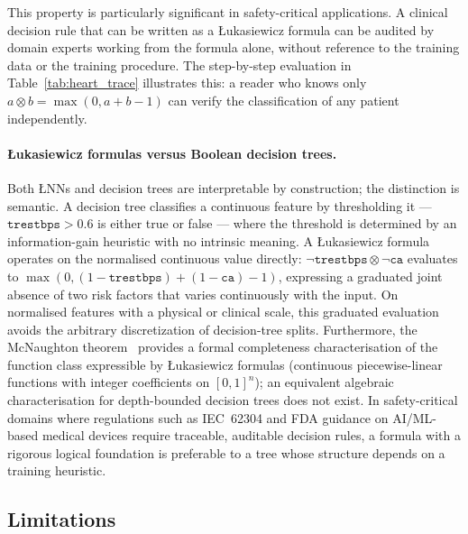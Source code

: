 \documentclass[10pt,a4paper,twoside]{article}
\newcommand{\tnorm}{\otimes}      %
\newcommand{\LNN}{\L{}NN}
\begin{document}
This property is particularly significant in safety-critical applications.
A clinical decision rule that can be written as a \L{}ukasiewicz formula can
be audited by domain experts working from the formula alone, without reference
to the training data or the training procedure.
The step-by-step evaluation in Table~\ref{tab:heart_trace} illustrates this:
a reader who knows only $a \tnorm b = \max(0, a+b-1)$ can verify the
classification of any patient independently.

\paragraph{\L{}ukasiewicz formulas versus Boolean decision trees.}
Both \LNN{}s and decision trees are interpretable by construction; the
distinction is semantic.
A decision tree classifies a continuous feature by thresholding it ---
$\mathtt{trestbps} > 0.6$ is either true or false --- where the threshold
is determined by an information-gain heuristic with no intrinsic meaning.
A \L{}ukasiewicz formula operates on the normalised continuous value
directly: $\neg\mathtt{trestbps} \tnorm \neg\mathtt{ca}$ evaluates to
$\max(0,(1-\mathtt{trestbps})+(1-\mathtt{ca})-1)$, expressing a graduated
joint absence of two risk factors that varies continuously with the input.
On normalised features with a physical or clinical scale, this graduated
evaluation avoids the arbitrary discretization of decision-tree splits.
Furthermore, the McNaughton theorem~\cite{mcnaughton1951} provides a formal
completeness characterisation of the function class expressible by
\L{}ukasiewicz formulas (continuous piecewise-linear functions with integer
coefficients on $[0,1]^n$); an equivalent algebraic characterisation for
depth-bounded decision trees does not exist.
In safety-critical domains where regulations such as IEC~62304 and FDA
guidance on AI/ML-based medical devices require traceable, auditable
decision rules, a formula with a rigorous logical foundation is preferable
to a tree whose structure depends on a training heuristic.

\subsection{Limitations}
\end{document}
